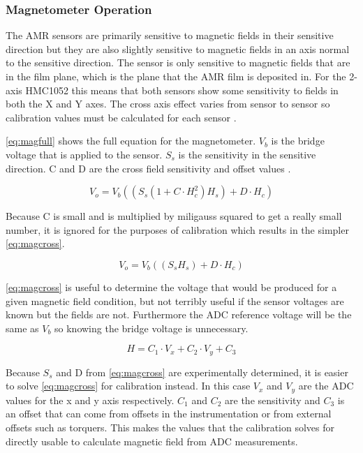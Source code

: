 \subsubsection{Magnetometer Operation}

The \ac{AMR} sensors are primarily sensitive to magnetic fields in their sensitive direction but they are also slightly sensitive to magnetic fields in an axis normal to the sensitive direction. The sensor is only sensitive to magnetic fields that are in the film plane, which is the plane that the \ac{AMR} film is deposited in. For the 2-axis HMC1052 this means that both sensors show some sensitivity to fields in both the X and Y axes. The cross axis effect varies from sensor to sensor  so calibration values must be calculated for each sensor \cite{AN215}.

\autoref{eq:magfull} shows the full equation for the magnetometer. $V_b$ is the bridge voltage that is applied to the sensor. $S_s$ is the sensitivity in the sensitive direction. C and D are the cross field sensitivity and offset values \cite{AN215}.

\begin{equation}
    V_o = V_b \left( \left( S_s \left( 1 + C \cdot H_c^2 \right) H_s \right) + D \cdot H_c \right)
    \label{eq:magfull}
\end{equation}

Because C is small and is multiplied by miligauss squared to get a really small number, it is ignored for the purposes of calibration which results in the simpler \autoref{eq:magcross}.

\begin{equation}
    V_o = V_b \left( \left( S_s H_s \right) + D \cdot H_c \right)
    \label{eq:magcross}
\end{equation}

\autoref{eq:magcross} is useful to determine the voltage that would be produced for a given magnetic field condition, but not terribly useful if the sensor voltages are known but the fields are not. Furthermore the \ac{ADC} reference voltage will be the same as $V_b$ so knowing the bridge voltage is unnecessary. 
 
\begin{equation}
    H = C_1 \cdot V_x + C_2 \cdot V_y + C_3
    \label{eq:magcal}
\end{equation}

Because $S_s$ and D from \autoref{eq:magcross} are experimentally determined, it is easier to solve \autoref{eq:magcross} for calibration instead. In this case $V_x$ and $V_y$ are the \ac{ADC} values for the x and y axis respectively. $C_1$ and $C_2$ are the sensitivity and $C_3$ is an offset that can come from offsets in the instrumentation or from external offsets such as torquers. This makes the values that the calibration solves for directly usable to calculate magnetic field from \ac{ADC} measurements.

